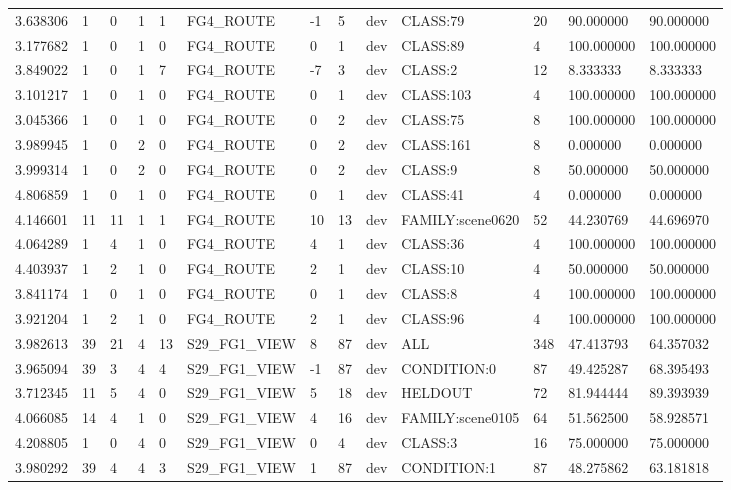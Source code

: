 \begin{tabular}{lllllllllllll}
3.638306 & 1 & 0 & 1 & 1 & FG4\_ROUTE & -1 & 5 & dev & CLASS:79 & 20 & 90.000000 & 90.000000 \\
3.177682 & 1 & 0 & 1 & 0 & FG4\_ROUTE & 0 & 1 & dev & CLASS:89 & 4 & 100.000000 & 100.000000 \\
3.849022 & 1 & 0 & 1 & 7 & FG4\_ROUTE & -7 & 3 & dev & CLASS:2 & 12 & 8.333333 & 8.333333 \\
3.101217 & 1 & 0 & 1 & 0 & FG4\_ROUTE & 0 & 1 & dev & CLASS:103 & 4 & 100.000000 & 100.000000 \\
3.045366 & 1 & 0 & 1 & 0 & FG4\_ROUTE & 0 & 2 & dev & CLASS:75 & 8 & 100.000000 & 100.000000 \\
3.989945 & 1 & 0 & 2 & 0 & FG4\_ROUTE & 0 & 2 & dev & CLASS:161 & 8 & 0.000000 & 0.000000 \\
3.999314 & 1 & 0 & 2 & 0 & FG4\_ROUTE & 0 & 2 & dev & CLASS:9 & 8 & 50.000000 & 50.000000 \\
4.806859 & 1 & 0 & 1 & 0 & FG4\_ROUTE & 0 & 1 & dev & CLASS:41 & 4 & 0.000000 & 0.000000 \\
4.146601 & 11 & 11 & 1 & 1 & FG4\_ROUTE & 10 & 13 & dev & FAMILY:scene0620 & 52 & 44.230769 & 44.696970 \\
4.064289 & 1 & 4 & 1 & 0 & FG4\_ROUTE & 4 & 1 & dev & CLASS:36 & 4 & 100.000000 & 100.000000 \\
4.403937 & 1 & 2 & 1 & 0 & FG4\_ROUTE & 2 & 1 & dev & CLASS:10 & 4 & 50.000000 & 50.000000 \\
3.841174 & 1 & 0 & 1 & 0 & FG4\_ROUTE & 0 & 1 & dev & CLASS:8 & 4 & 100.000000 & 100.000000 \\
3.921204 & 1 & 2 & 1 & 0 & FG4\_ROUTE & 2 & 1 & dev & CLASS:96 & 4 & 100.000000 & 100.000000 \\
3.982613 & 39 & 21 & 4 & 13 & S29\_FG1\_VIEW & 8 & 87 & dev & ALL & 348 & 47.413793 & 64.357032 \\
3.965094 & 39 & 3 & 4 & 4 & S29\_FG1\_VIEW & -1 & 87 & dev & CONDITION:0 & 87 & 49.425287 & 68.395493 \\
3.712345 & 11 & 5 & 4 & 0 & S29\_FG1\_VIEW & 5 & 18 & dev & HELDOUT & 72 & 81.944444 & 89.393939 \\
4.066085 & 14 & 4 & 1 & 0 & S29\_FG1\_VIEW & 4 & 16 & dev & FAMILY:scene0105 & 64 & 51.562500 & 58.928571 \\
4.208805 & 1 & 0 & 4 & 0 & S29\_FG1\_VIEW & 0 & 4 & dev & CLASS:3 & 16 & 75.000000 & 75.000000 \\
3.980292 & 39 & 4 & 4 & 3 & S29\_FG1\_VIEW & 1 & 87 & dev & CONDITION:1 & 87 & 48.275862 & 63.181818 \\

\end{tabular}
